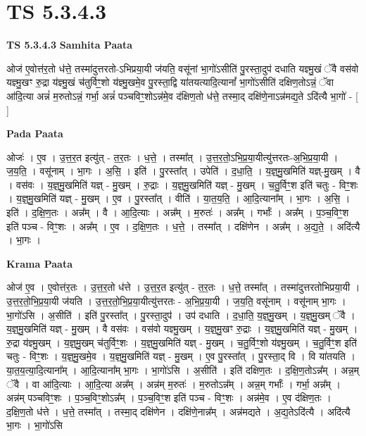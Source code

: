 \documentclass[17pt]{extarticle}
\begin{document}
\section{ TS 5.3.4.3 }

\textbf{TS 5.3.4.3 } \newline
\textbf{Samhita Paata} \newline

ओज॑ ए॒वोत्त॑र॒तो ध॑त्ते॒ तस्मा॑दुत्तरतो-ऽभिप्रया॒यी ज॑यति॒ वसू॑नां भा॒गो॑ऽसीति॑ पु॒रस्ता॒दुप॑ दधाति यज्ञ्मु॒खं ॅवै वस॑वो यज्ञ्मु॒खꣳ रु॒द्रा य॑ज्ञ्मु॒खं च॑तुर्विꣳ॒॒शो य॑ज्ञ्मु॒खमे॒व पु॒रस्ता॒द्वि या॑तयत्यादि॒त्यानां᳚ भा॒गो॑ऽसीति॑ दक्षिण॒तोऽन्नं॒ ॅवा आ॑दि॒त्या अन्नं॑ म॒रुतोऽन्नं॒ गर्भा॒ अन्नं॑ पञ्चविꣳ॒॒शोऽन्न॑मे॒व द॑क्षिण॒तो ध॑त्ते॒ तस्मा॒द् दक्षि॑णे॒नाऽन्न॑मद्य॒ते ऽदि॑त्यै भा॒गो॑ - [  ] \newline

\textbf{Pada Paata} \newline

ओजः॑ । ए॒व । उ॒त्त॒र॒त इत्यु॑त् - त॒र॒तः । ध॒त्ते॒ । तस्मा᳚त् । उ॒त्त॒र॒तो॒ऽभि॒प्र॒या॒यीत्यु॑त्तरतः-अ॒भि॒प्र॒या॒यी । ज॒य॒ति॒ । वसू॑नाम् । भा॒गः । अ॒सि॒ । इति॑ । पु॒रस्ता᳚त् । उपेति॑ । द॒धा॒ति॒ । य॒ज्ञ्॒मु॒खमिति॑ यज्ञ्-मु॒खम् । वै । वस॑वः । य॒ज्ञ्॒मु॒खमिति॑ यज्ञ् - मु॒खम् । रु॒द्राः । य॒ज्ञ्॒मु॒खमिति॑ यज्ञ् - मु॒खम् । च॒तु॒र्विꣳ॒॒श इति॑ चतुः - विꣳ॒॒शः । य॒ज्ञ्॒मु॒खमिति॑ यज्ञ् - मु॒खम् । ए॒व । पु॒रस्ता᳚त् । वीति॑ । या॒त॒य॒ति॒ । आ॒दि॒त्याना᳚म् । भा॒गः । अ॒सि॒ । इति॑ । द॒क्षि॒ण॒तः । अन्न᳚म् । वै । आ॒दि॒त्याः । अन्न᳚म् । म॒रुतः॑ । अन्न᳚म् । गर्भाः᳚ । अन्न᳚म् । प॒ञ्च॒विꣳ॒॒श इति॑ पञ्च - विꣳ॒॒शः । अन्न᳚म् । ए॒व । द॒क्षि॒ण॒तः । ध॒त्ते॒ । तस्मा᳚त् । दक्षि॑णेन । अन्न᳚म् । अ॒द्य॒ते॒ । अदि॑त्यै । भा॒गः ।  \newline


\textbf{Krama Paata} \newline

ओज॑ ए॒व । ए॒वोत्त॑र॒तः । उ॒त्त॒र॒तो ध॑त्ते । उ॒त्त॒र॒त इत्यु॑त् - त॒र॒तः । ध॒त्ते॒ तस्मा᳚त् । तस्मा॑दुत्तरतोभिप्रया॒यी । उ॒त्त॒र॒तो॒भि॒प्र॒या॒यी ज॑यति । उ॒त्त॒र॒तो॒भि॒प्र॒या॒यीत्यु॑त्तरतः - अ॒भि॒प्र॒या॒यी । ज॒य॒ति॒ वसू॑नाम् । वसू॑नाम् भा॒गः । भा॒गो॑ऽसि । अ॒सीति॑ । इति॑ पु॒रस्ता᳚त् । पु॒रस्ता॒दुप॑ । उप॑ दधाति । द॒धा॒ति॒ य॒ज्ञ्॒मु॒खम् । य॒ज्ञ्॒मु॒खम् ॅवै । य॒ज्ञ्॒मु॒खमिति॑ यज्ञ् - मु॒खम् । वै वस॑वः । वस॑वो यज्ञ्मु॒खम् । य॒ज्ञ्॒मु॒खꣳ रु॒द्राः । य॒ज्ञ्॒मु॒खमिति॑ यज्ञ् - मु॒खम् । रु॒द्रा य॑ज्ञ्मु॒खम् । य॒ज्ञ्॒मु॒खम् च॑तुर्विꣳ॒॒शः । य॒ज्ञ्॒मु॒खमिति॑ यज्ञ् - मु॒खम् । च॒तु॒र्विꣳ॒॒शो य॑ज्ञ्मु॒खम् । च॒तु॒र्विꣳ॒॒श इति॑ चतुः - विꣳ॒॒शः । य॒ज्ञ्॒मु॒खमे॒व । य॒ज्ञ्॒मु॒खमिति॑ यज्ञ् - मु॒खम् । ए॒व पु॒रस्ता᳚त् । पु॒रस्ता॒द् वि । वि या॑तयति । या॒त॒य॒त्या॒दि॒त्याना᳚म् । आ॒दि॒त्याना᳚म् भा॒गः । भा॒गो॑ऽसि । अ॒सीति॑ । इति॑ दक्षिण॒तः । द॒क्षि॒ण॒तोऽन्न᳚म् । अन्न॒म् ॅवै । वा आ॑दि॒त्याः । आ॒दि॒त्या अन्न᳚म् । अन्न॑म् म॒रुतः॑ । म॒रुतोऽन्न᳚म् । अन्न॒म् गर्भाः᳚ । गर्भा॒ अन्न᳚म् । अन्न॑म् पञ्चविꣳ॒॒शः । प॒ञ्च॒विꣳ॒॒शोऽन्न᳚म् । प॒ञ्च॒विꣳ॒॒श इति॑ पञ्च - विꣳ॒॒शः । अन्न॑मे॒व । ए॒व द॑क्षिण॒तः । द॒क्षि॒ण॒तो ध॑त्ते । ध॒त्ते॒ तस्मा᳚त् । तस्मा॒द् दक्षि॑णेन । दक्षि॑णे॒नान्न᳚म् । अन्न॑मद्यते । अ॒द्य॒तेऽदि॑त्यै । अदि॑त्यै भा॒गः । भा॒गो॑ऽसि \newline
\end{document}

